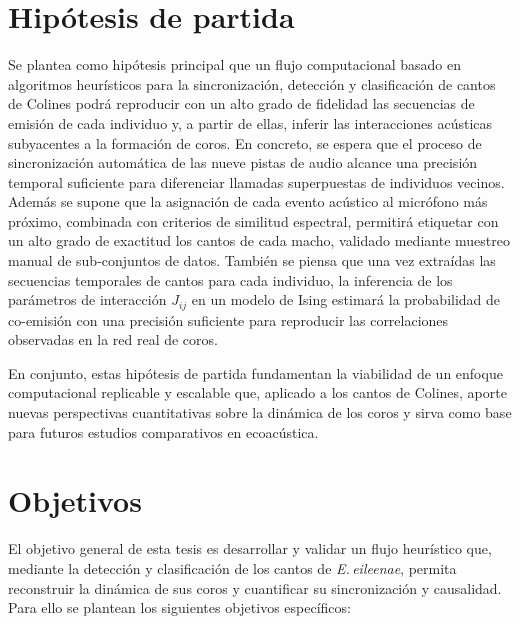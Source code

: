 \section{Hipótesis de partida}
\label{sec:hipotesis}

Se plantea como hipótesis principal que un flujo computacional 
basado en algoritmos heurísticos para la sincronización, 
detección y clasificación de cantos de Colines podrá reproducir con un alto 
grado de fidelidad las secuencias de emisión de cada individuo 
y, a partir de ellas, inferir las interacciones acústicas 
subyacentes a la formación de coros. En concreto, se espera 
que el proceso de sincronización automática de las nueve 
pistas de audio alcance una precisión temporal suficiente para 
diferenciar llamadas superpuestas de individuos vecinos. 
Además se supone que la asignación de cada evento acústico al 
micrófono más próximo, combinada con criterios de similitud 
espectral, permitirá etiquetar con un alto grado de 
exactitud los cantos de cada macho, validado mediante muestreo 
manual de sub-conjuntos de datos. 
También se piensa que una vez extraídas las secuencias temporales de cantos para 
cada individuo, la inferencia de los parámetros de interacción 
\(J_{ij}\) en un modelo de Ising estimará la probabilidad de 
co-emisión con una precisión suficiente para reproducir las 
correlaciones observadas en la red real de coros.  


En conjunto, estas hipótesis de partida fundamentan la 
viabilidad de un enfoque computacional replicable y escalable 
que, aplicado a los cantos de Colines, aporte 
nuevas perspectivas cuantitativas sobre la dinámica de los coros 
y sirva como base para futuros estudios comparativos en 
ecoacústica.  


\section{Objetivos}
\label{sec:objetivos}

El objetivo general de esta tesis es desarrollar y 
validar un flujo heurístico que, mediante la detección y 
clasificación de los cantos de \emph{E.\,eileenae}, permita 
reconstruir la dinámica de sus coros y cuantificar su 
sincronización y causalidad.
Para ello se plantean los siguientes objetivos específicos:


